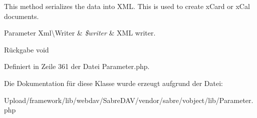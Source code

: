 This method serializes the data into X\+ML. This is used to create x\+Card or x\+Cal documents.


\begin{DoxyParams}[1]{Parameter}
Xml\textbackslash{}\+Writer & {\em \$writer} & X\+ML writer.\\
\hline
\end{DoxyParams}
\begin{DoxyReturn}{Rückgabe}
void 
\end{DoxyReturn}


Definiert in Zeile 361 der Datei Parameter.\+php.



Die Dokumentation für diese Klasse wurde erzeugt aufgrund der Datei\+:\begin{DoxyCompactItemize}
\item 
Upload/framework/lib/webdav/\+Sabre\+D\+A\+V/vendor/sabre/vobject/lib/Parameter.\+php\end{DoxyCompactItemize}
